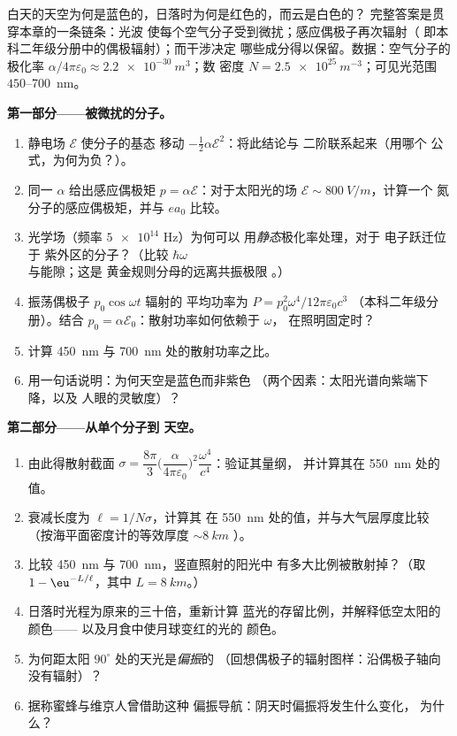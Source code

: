 \begin{problem}\label{pb:b3:perturbation-theory:1}
白天的天空为何是蓝色的，日落时为何是红色的，而云是白色的？
完整答案是贯穿本章的一条链条：光波
使每个空气分子受到微扰；感应偶极子再次辐射（
即本科二年级分册中的偶极辐射）；而干涉决定
哪些成分得以保留。数据：空气分子的极化率
$\alpha/4\pi\varepsilon_0 \approx \qty{2.2e-30}{m^3}$；数
密度 $N = \qty{2.5e25}{m^{-3}}$；可见光范围
$450$--\qty{700}{nm}。

\medskip\noindent\textbf{第一部分——被微扰的分子。}
\begin{enumerate}
  \item 静电场 $\mathcal E$ 使分子的基态
        移动 $-\tfrac12\alpha\mathcal E^2$：将此结论与
        二阶联系起来（用哪个
        公式，为何为负？）。
  \item 同一 $\alpha$ 给出感应偶极矩 $p =
        \alpha\mathcal E$：对于太阳光的场 $\mathcal E \sim
        \qty{800}{V/m}$，计算一个
        氮分子的感应偶极矩，并与 $ea_0$ 比较。
  \item 光学场（频率 $\num{5e14}$ Hz）为何可以
        用\emph{静态}极化率处理，对于
        电子跃迁位于
        紫外区的分子？（比较 $\hbar\omega$ 与能隙；这是
        黄金规则分母的远离共振极限
        。）
  \item 振荡偶极子 $p_0\cos\omega t$ 辐射的
        平均功率为 $P = p_0^2\omega^4/12\pi\varepsilon_0c^3$
        （本科二年级分册）。结合 $p_0 = \alpha\mathcal
        E_0$：散射功率如何依赖于 $\omega$，
        在照明固定时？
  \item 计算 \qty{450}{nm}
        与 \qty{700}{nm} 处的散射功率之比。
  \item 用一句话说明：为何天空是蓝色而非紫色
        （两个因素：太阳光谱向紫端下降，以及
        人眼的灵敏度）？
\end{enumerate}

\medskip\noindent\textbf{第二部分——从单个分子到
天空。}
\begin{enumerate}[resume]
  \item 由此得散射截面 $\sigma =
        \dfrac{8\pi}{3}\Big(\dfrac{\alpha}{4\pi\varepsilon_0}
        \Big)^2\dfrac{\omega^4}{c^4}$：验证其量纲，
        并计算其在 \qty{550}{nm} 处的值。
  \item 衰减长度为 $\ell = 1/N\sigma$，计算其
        在 \qty{550}{nm} 处的值，并与大气层厚度比较
        （按海平面密度计的等效厚度 $\sim\qty{8}{km}$
        ）。
  \item 比较 \qty{450}{nm} 与 \qty{700}{nm}，竖直照射的阳光中
        有多大比例被散射掉？（取 $1 -
        \eu^{-L/\ell}$，其中 $L = \qty{8}{km}$。）
  \item 日落时光程为原来的三十倍，重新计算
        蓝光的存留比例，并解释低空太阳的颜色——
        以及月食中使月球变红的光的
        颜色。
  \item 为何距太阳 $90^\circ$ 处的天光是\emph{偏振}的
        （回想偶极子的辐射图样：沿偶极子轴向
        没有辐射）？
  \item 据称蜜蜂与维京人曾借助这种
        偏振导航：阴天时偏振将发生什么变化，
        为什么？
\end{enumerate}


\end{problem}
